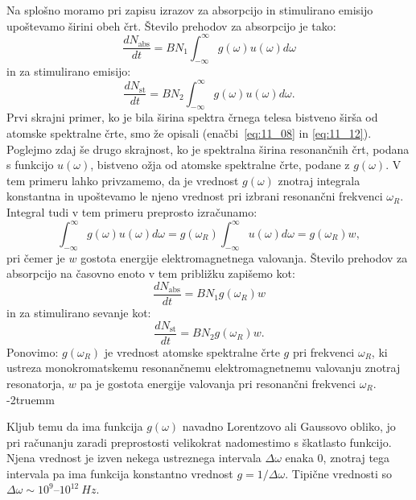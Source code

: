 Na splošno moramo pri zapisu izrazov za absorpcijo in stimulirano emisijo 
upoštevamo širini obeh črt. Število prehodov za absorpcijo je tako:
\begin{equation}
\frac{dN_\mathrm{abs}}{dt} = BN_1 \int_{-\infty}^{\infty} g(\omega) u(\omega) d\omega
\label{eq:11_22}
\end{equation}
in za stimulirano emisijo:
\begin{equation}
\frac{dN_\mathrm{st}}{dt} = BN_2 \int_{-\infty}^{\infty} g(\omega) u(\omega) d\omega.
\label{eq:11_23}
\end{equation}
Prvi skrajni primer, ko je bila širina spektra črnega telesa bistveno širša
od atomske spektralne črte, smo že opisali (enačbi~\ref{eq:11_08} in \ref{eq:11_12}). 
Poglejmo zdaj še drugo skrajnost, 
ko je spektralna širina resonančnih črt, podana s funkcijo $u(\omega)$, bistveno 
ožja od atomske spektralne črte, podane z $g(\omega)$. V tem primeru 
lahko privzamemo, da je vrednost $g(\omega)$ znotraj integrala konstantna in 
upoštevamo le njeno vrednost pri izbrani resonančni frekvenci $\omega_R$.
Integral tudi v tem primeru preprosto izračunamo:
\begin{equation}
\int_{-\infty}^{\infty} g(\omega) u(\omega) d\omega = g(\omega_R) \int_{-\infty}^{\infty}
u(\omega) d\omega = g(\omega_R) w,
\label{eq:11_24}
\end{equation}
pri čemer je $w$ gostota energije elektromagnetnega valovanja. 
Število prehodov za absorpcijo na časovno enoto v tem približku zapišemo kot:
\begin{equation}
\frac{dN_\mathrm{abs}}{dt} = B N_1 g(\omega_R) w
\label{eq:11_25}
\end{equation}
in za stimulirano sevanje kot:
\begin{equation}
\frac{dN_\mathrm{st}}{dt} = B N_2 g(\omega_R) w.
\label{eq:11_26}
\end{equation}
Ponovimo: $g(\omega_R)$ je vrednost atomske spektralne črte $g$ pri 
frekvenci $\omega_R$, ki ustreza monokromatskemu resonančnemu 
elektromagnetnemu valovanju znotraj resonatorja, $w$ pa je gostota
energije valovanja pri resonančni frekvenci $\omega_R$. 
\vglue-2truemm
\begin{remark}
Kljub temu da ima funkcija $g(\omega)$ navadno Lorentzovo ali Gaussovo 
obliko, jo pri računanju zaradi preprostosti velikokrat nadomestimo 
s škatlasto funkcijo. Njena vrednost je izven nekega ustreznega 
intervala $\Delta \omega$ enaka 0, znotraj tega intervala pa ima 
funkcija konstantno vrednost $g = 1/\Delta \omega$. Tipične vrednosti
so $\Delta \omega \sim 10^9$--$10^{12}~\si{Hz}$.
\end{remark}

